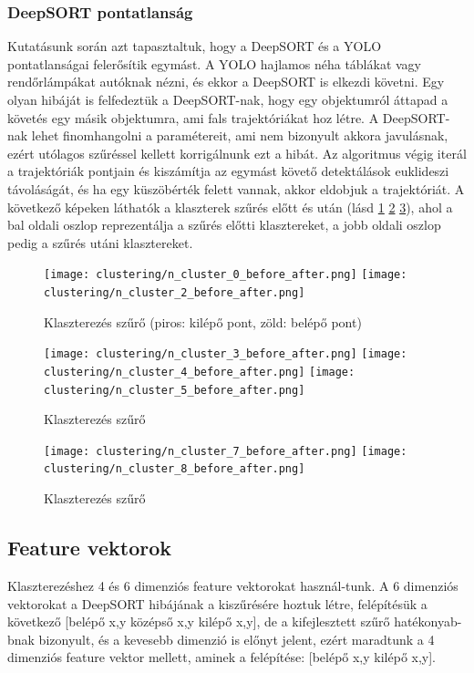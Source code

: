 \documentclass[12pt,a4paper]{article}
\begin{document}
\subsubsection{DeepSORT pontatlanság}
Kutatásunk során azt tapasztaltuk, hogy a DeepSORT és a YOLO pontatlanságai felerősítik egymást. A YOLO hajlamos néha táblákat
vagy rendőrlámpákat autóknak nézni, és ekkor a DeepSORT is elkezdi követni. Egy olyan hibáját is felfedeztük a DeepSORT-nak, hogy
egy objektumról áttapad a követés egy másik objektumra, ami fals trajektóriákat hoz létre. A DeepSORT-nak lehet finomhangolni a
paramétereit, ami nem bizonyult akkora javulásnak, ezért utólagos szűréssel kellett korrigálnunk ezt a hibát. Az algoritmus végig
iterál a trajektóriák pontjain és kiszámítja az egymást követő detektálások euklideszi távoláságát, és ha egy küszöbérték felett vannak, akkor eldobjuk a trajektóriát.
A következő képeken láthatók a klaszterek szűrés előtt és után (lásd \ref{fig: Klaszterezés szűrő} \ref{fig: Klaszterezés szűrő2} \ref{fig: Klaszterezés szűrő3}), ahol a bal oldali oszlop reprezentálja a szűrés előtti klasztereket, a jobb oldali oszlop pedig a szűrés utáni klasztereket.

\begin{figure}[htbp]
    \centering
    \texttt{[image: clustering/n\_cluster\_0\_before\_after.png]}
    \centering
    \texttt{[image: clustering/n\_cluster\_2\_before\_after.png]}
    \caption{Klaszterezés szűrő (piros: kilépő pont, zöld: belépő pont)}
    \label{fig: Klaszterezés szűrő}
\end{figure}
\begin{figure}[htbp]
    \centering
    \texttt{[image: clustering/n\_cluster\_3\_before\_after.png]}
    \centering
    \texttt{[image: clustering/n\_cluster\_4\_before\_after.png]}
    \centering
    \texttt{[image: clustering/n\_cluster\_5\_before\_after.png]}
    \caption{Klaszterezés szűrő}
    \label{fig: Klaszterezés szűrő2}
\end{figure}
\begin{figure}[htbp]
    \texttt{[image: clustering/n\_cluster\_7\_before\_after.png]}
    \texttt{[image: clustering/n\_cluster\_8\_before\_after.png]}
    \caption{Klaszterezés szűrő}
    \label{fig: Klaszterezés szűrő3}
\end{figure}

\subsection{Feature vektorok}
Klaszterezéshez 4 és 6 dimenziós feature vektorokat használ-tunk. A 6 dimenziós vektorokat a DeepSORT hibájának a kiszűrésére hoztuk létre, felépítésük a következő [belépő x,y középső x,y kilépő x,y], de a kifejlesztett szűrő hatékonyab-bnak bizonyult, és a kevesebb dimenzió is előnyt jelent, ezért maradtunk a 4 dimenziós feature vektor mellett, aminek a felépítése: [belépő x,y kilépő x,y].
\end{document}
